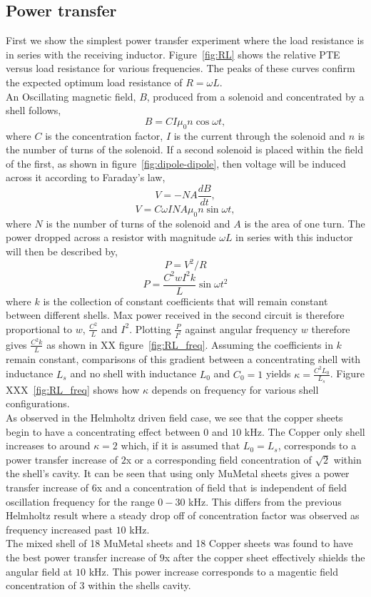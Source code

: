 \documentclass[11pt]{iopart}
\begin{document}


\subsection{Power transfer}
First we show the simplest power transfer experiment where the load
resistance is in series with the receiving
inductor. Figure~\ref{fig:RL} shows the relative PTE versus load
resistance for various frequencies. The peaks of these curves confirm
the expected optimum load resistance of $R = \omega
L$. \\
An Oscillating magnetic field, $B$, produced from a solenoid and
concentrated by a shell follows,
$$B = CI\mu_0n\cos{\omega t},$$
where $C$ is the concentration factor, $I$ is the current through the
solenoid and $n$ is the number of turns of the solenoid.  If a second
solenoid is placed within the field of the first, as shown in
figure~\ref{fig:dipole-dipole}, then voltage will be induced across it
according to Faraday's law,
$$V = -NA\frac{dB}{dt},$$
$$V = C\omega I NA\mu_0n\sin{\omega t},$$
where $N$ is the number of turns of the solenoid and $A$ is the area
of one turn.
The power dropped across a resistor with magnitude $\omega L$ in
series with this inductor will then be described by,
$$ P = V^2/R $$
$$ P = \frac{C^2wI^2k}{L}\sin{\omega t}^2$$
where $k$ is the collection of constant coefficients that will remain
constant between different shells.  Max power received in the second
circuit is therefore proportional to $w$, $\frac{C^2}{L}$ and
$I^2$. Plotting $\frac{P}{I^2}$ against angular frequency $w$
therefore gives $\frac{C^2k}{L}$ as shown in XX
figure~\ref{fig:RL_freq}. Assuming the coefficients in $k$ remain
constant, comparisons of this gradient between a concentrating shell
with inductance $L_s$ and no shell with inductance $L_0$ and $C_0 = 1$
yields $\kappa = \frac{C^2L_0}{L_s}$. Figure XXX~\ref{fig:RL_freq}
shows how $\kappa$ depends on frequency for various shell
configurations.\\
As observed in the Helmholtz driven field case, we see that the copper
sheets begin to have a concentrating effect between $0$ and $10$
kHz. The Copper only shell increases to around $\kappa = 2$ which, if
it is assumed that $L_0 = L_s$, corresponds to a power transfer
increase of $2$x or a corresponding field concentration of $\sqrt{2}$
within the shell's cavity. It can be seen that using only MuMetal
sheets gives a power transfer increase of $6$x and a concentration of
field that is independent of field oscillation frequency for the range
$0 - 30$ kHz. This differs from the previous Helmholtz result where a
steady drop off of concentration factor was observed as frequency
increased past $10$ kHz.\\
The mixed shell of 18 MuMetal sheets and 18 Copper sheets was found to
have the best power transfer increase of $9$x after the copper sheet
effectively shields the angular field at $10$ kHz. This power increase
corresponds to a magentic field concentration of $3$ within the shells
cavity.\\
\end{document}
